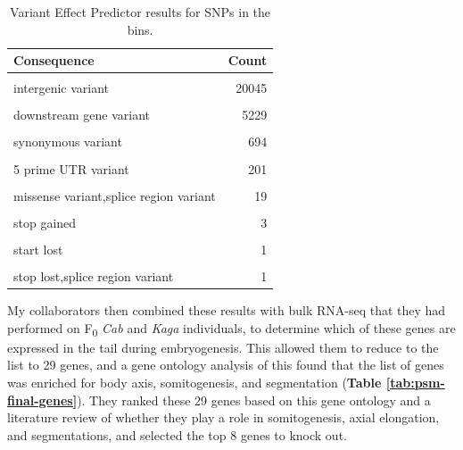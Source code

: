 \documentclass[
]{book}
\begin{document}
\begin{table}

\caption{\label{tab:int-consequence-tbl}Variant Effect Predictor results for SNPs in the bins.}
\centering
\begin{tabular}[t]{lr}
\toprule
Consequence & Count\\
\midrule
\cellcolor{gray!6}{intron variant} & \cellcolor{gray!6}{47211}\\
intergenic variant & 20045\\
\cellcolor{gray!6}{upstream gene variant} & \cellcolor{gray!6}{7304}\\
downstream gene variant & 5229\\
\cellcolor{gray!6}{3 prime UTR variant} & \cellcolor{gray!6}{1082}\\
\addlinespace
synonymous variant & 694\\
\cellcolor{gray!6}{missense variant} & \cellcolor{gray!6}{383}\\
5 prime UTR variant & 201\\
\cellcolor{gray!6}{splice region variant,intron variant} & \cellcolor{gray!6}{126}\\
missense variant,splice region variant & 19\\
\addlinespace
\cellcolor{gray!6}{splice region variant,synonymous variant} & \cellcolor{gray!6}{17}\\
stop gained & 3\\
\cellcolor{gray!6}{splice donor variant} & \cellcolor{gray!6}{1}\\
start lost & 1\\
\cellcolor{gray!6}{stop lost} & \cellcolor{gray!6}{1}\\
\addlinespace
stop lost,splice region variant & 1\\
\bottomrule
\end{tabular}
\end{table}

My collaborators then combined these results with bulk RNA-seq that they had performed on F\textsubscript{0} \emph{Cab} and \emph{Kaga} individuals, to determine which of these genes are expressed in the tail during embryogenesis. This allowed them to reduce to the list to 29 genes, and a gene ontology analysis of this found that the list of genes was enriched for body axis, somitogenesis, and segmentation (\textbf{Table \ref{tab:psm-final-genes}}). They ranked these 29 genes based on this gene ontology and a literature review of whether they play a role in somitogenesis, axial elongation, and segmentations, and selected the top 8 genes to knock out.
\end{document}
